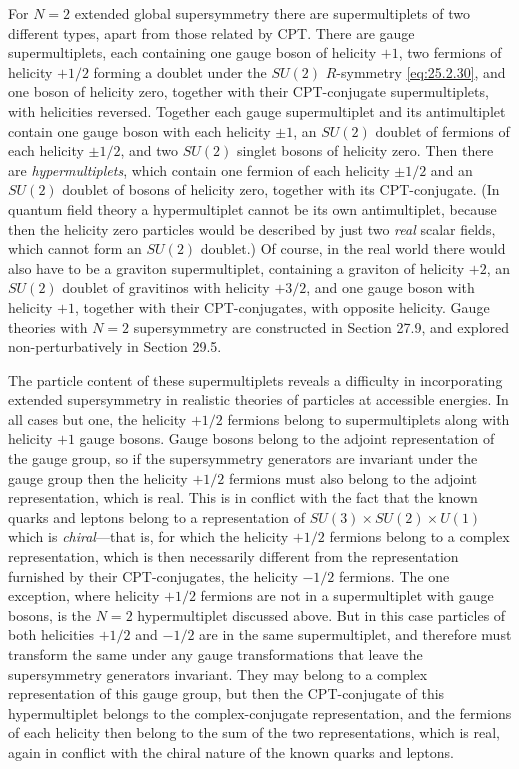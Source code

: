 For $N=2$ extended global supersymmetry there are supermultiplets of two
different types, apart from those related by CPT. There are gauge
supermultiplets, each containing one gauge boson of helicity $+1$, two
fermions of helicity $+1/2$ forming a doublet under the $SU(2)$ $R$-symmetry
\eqref{eq:25.2.30}, and one boson of helicity zero, together with their
CPT-conjugate supermultiplets, with helicities reversed. Together each gauge
supermultiplet and its antimultiplet contain one gauge boson with each helicity
$\pm1$, an $SU(2)$ doublet of fermions of each helicity $\pm1/2$, and two
$SU(2)$ singlet bosons of helicity zero. Then there are
\emph{hypermultiplets}, which contain one fermion of each helicity $\pm1/2$
and an $SU(2)$ doublet of bosons of helicity zero, together with its
CPT-conjugate. (In quantum field theory a hypermultiplet cannot be its own
antimultiplet, because then the helicity zero particles would be described by
just two \emph{real} scalar fields, which cannot form an $SU(2)$ doublet.) Of
course, in the real world there would also have to be a graviton
supermultiplet, containing a graviton of helicity $+2$, an $SU(2)$ doublet of
gravitinos with helicity $+3/2$, and one gauge boson with helicity $+1$,
together with their CPT-conjugates, with opposite helicity. Gauge theories
with $N=2$ supersymmetry are constructed in Section 27.9, and explored
non-perturbatively in Section 29.5.

The particle content of these supermultiplets reveals a difficulty in
incorporating extended supersymmetry in realistic theories of particles at
accessible energies. In all cases but one, the helicity $+1/2$ fermions belong
to supermultiplets along with helicity $+1$ gauge bosons. Gauge bosons belong
to the adjoint representation of the gauge group, so if the supersymmetry
generators are invariant under the gauge group then the helicity $+1/2$
fermions must also belong to the adjoint representation, which is real. This
is in conflict with the fact that the known quarks and leptons belong to a
representation of $SU(3)\times SU(2)\times U(1)$ which is \emph{chiral}---that
is, for which the helicity $+1/2$ fermions belong to a complex representation,
which is then necessarily different from the representation furnished by
their CPT-conjugates, the helicity $-1/2$ fermions. The one exception, where
helicity $+1/2$ fermions are not in a supermultiplet with gauge bosons, is the
$N=2$ hypermultiplet discussed above. But in this case particles of both
helicities $+1/2$ and $-1/2$ are in the same supermultiplet, and therefore must
transform the same under any gauge transformations that leave the
supersymmetry generators invariant. They may belong to a complex
representation of this gauge group, but then the CPT-conjugate of this
hypermultiplet belongs to the complex-conjugate representation, and the
fermions of each helicity then belong to the sum of the two representations,
which is real, again in conflict with the chiral nature of the known quarks
and leptons.

